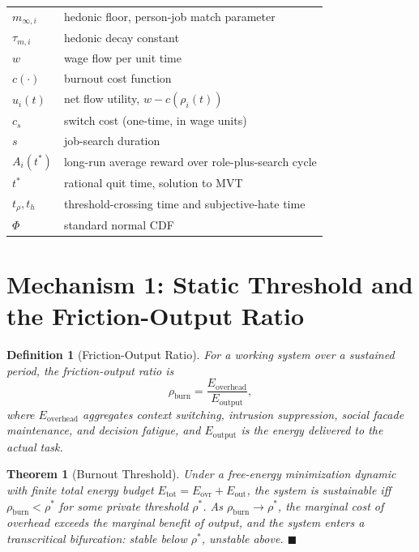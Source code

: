 \documentclass[11pt]{article}
\newtheorem{theorem}{Theorem}
\newtheorem{definition}{Definition}
\begin{document}
\begin{center}
\begin{tabular}{ll}
$m_{\infty,i}$                 & hedonic floor, person-job match parameter \\
$\tau_{m,i}$                   & hedonic decay constant \\
$w$                            & wage flow per unit time \\
$c(\cdot)$                     & burnout cost function \\
$u_i(t)$                       & net flow utility, $w - c(\rho_i(t))$ \\
$c_s$                          & switch cost (one-time, in wage units) \\
$s$                            & job-search duration \\
$A_i(t^*)$                     & long-run average reward over role-plus-search cycle \\
$t^*$                          & rational quit time, solution to MVT \\
$t_\rho, t_h$                  & threshold-crossing time and subjective-hate time \\
$\Phi$                         & standard normal CDF \\
\bottomrule
\end{tabular}
\end{center}

\section{Mechanism 1: Static Threshold and the Friction-Output Ratio}
\label{sec:m1}

\begin{definition}[Friction-Output Ratio]
\label{def:fr}
For a working system over a sustained period, the friction-output ratio is
\[
\rho_{\text{burn}} = \frac{E_{\text{overhead}}}{E_{\text{output}}},
\]
where $E_{\text{overhead}}$ aggregates context switching, intrusion suppression,
social facade maintenance, and decision fatigue, and $E_{\text{output}}$ is
the energy delivered to the actual task.
\end{definition}

\begin{theorem}[Burnout Threshold]
\label{thm:thresh}
Under a free-energy minimization dynamic with finite total energy budget
$E_{\text{tot}} = E_{\text{ovr}} + E_{\text{out}}$, the system is sustainable
iff $\rho_{\text{burn}} < \rho^*$ for some private threshold $\rho^*$. As
$\rho_{\text{burn}} \to \rho^*$, the marginal cost of overhead exceeds the
marginal benefit of output, and the system enters a transcritical bifurcation:
stable below $\rho^*$, unstable above. \hfill$\blacksquare$
\end{theorem}
\end{document}
